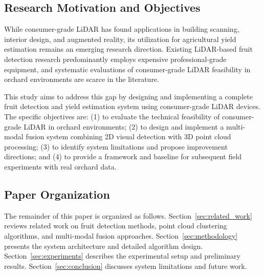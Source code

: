 \subsection{Research Motivation and Objectives}
While consumer-grade LiDAR has found applications in building scanning, interior design, and augmented reality, its utilization for agricultural yield estimation remains an emerging research direction. Existing LiDAR-based fruit detection research predominantly employs expensive professional-grade equipment, and systematic evaluations of consumer-grade LiDAR feasibility in orchard environments are scarce in the literature.

This study aims to address this gap by designing and implementing a complete fruit detection and yield estimation system using consumer-grade LiDAR devices. The specific objectives are: (1) to evaluate the technical feasibility of consumer-grade LiDAR in orchard environments; (2) to design and implement a multi-modal fusion system combining 2D visual detection with 3D point cloud processing; (3) to identify system limitations and propose improvement directions; and (4) to provide a framework and baseline for subsequent field experiments with real orchard data.

\subsection{Paper Organization}
The remainder of this paper is organized as follows. Section~\ref{sec:related_work} reviews related work on fruit detection methods, point cloud clustering algorithms, and multi-modal fusion approaches. Section~\ref{sec:methodology} presents the system architecture and detailed algorithm design. Section~\ref{sec:experiments} describes the experimental setup and preliminary results. Section~\ref{sec:conclusion} discusses system limitations and future work.